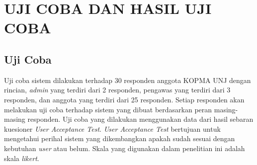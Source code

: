 
\chapter{UJI COBA DAN HASIL UJI COBA}

\section{Uji Coba}
Uji coba sistem dilakukan terhadap 30 responden anggota KOPMA UNJ dengan rincian, \textit{admin} yang terdiri dari 2 responden, pengawas yang terdiri dari 3 responden, dan anggota yang terdiri dari 25 responden. Setiap responden akan melakukan uji coba terhadap sistem yang dibuat berdasarkan peran masing-masing responden. Uji coba yang dilakukan menggunakan data dari hasil sebaran kuesioner \textit{User Acceptance Test}. \textit{User Acceptance Test} bertujuan untuk mengetahui perihal sistem yang dikembangkan apakah sudah sesuai dengan kebutuhan \textit{user} atau belum. Skala yang digunakan dalam penelitian ini adalah skala \textit{likert}.

